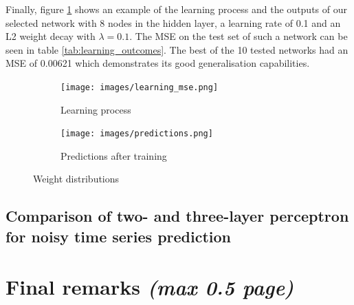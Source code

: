 \documentclass[a4paper]{article}
\begin{document}
Finally, figure \ref{fig:learning_process} shows an example of the learning process and the outputs of our selected network with 8 nodes in the hidden layer, a learning rate of 0.1 and an L2 weight decay with $\lambda = 0.1$. The MSE on the test set of such a network can be seen in table \ref{tab:learning_outcomes}. The best of the 10 tested networks had an MSE of 0.00621 which demonstrates its good generalisation capabilities.

\begin{figure}[h!]
	\begin{subfigure}{.5\linewidth}
		\texttt{[image: images/learning\_mse.png]}
		\centering
		\caption{\small Learning process}
	\end{subfigure}
	\begin{subfigure}{.5\linewidth}
		\centering
		\texttt{[image: images/predictions.png]}
		\caption{\small Predictions after training}
	\end{subfigure}
	\caption{Weight distributions}
	\label{fig:learning_process}
\end{figure}

\subsection{Comparison of two- and three-layer perceptron for noisy time series prediction}

\section{Final remarks \normalsize{\textit{(max 0.5 page)}}}
\end{document}
